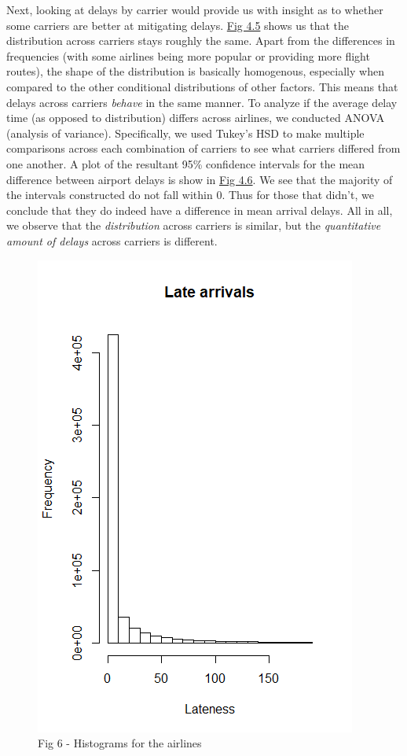 \documentclass[12pt, a4paper, openany]{book}
\newcommand\tab[1][1cm]{\hspace*{#1}}
\begin{document}
			\tab Next, looking at delays by carrier would provide us with insight as to whether some carriers are better at mitigating delays. \underline{Fig 4.5} shows us that the distribution across carriers stays roughly the same. Apart from the differences in frequencies (with some airlines being more popular or providing more flight routes), the shape of the distribution is basically homogenous, especially when compared to the other conditional distributions of other factors. This means that delays across carriers \textit{behave} in the same manner. To analyze if the average delay time (as opposed to distribution) differs across airlines, we conducted ANOVA (analysis of variance). Specifically, we used Tukey’s HSD to make multiple comparisons across each combination of carriers to see what carriers differed from one another. A plot of the resultant 95\% confidence intervals for the mean difference between airport delays is show in \underline{Fig 4.6}. We see that the majority of the intervals constructed do not fall within 0. Thus for those that didn’t, we conclude that they do indeed have a difference in mean arrival delays. All in all, we observe that the \textit{distribution} across carriers is similar, but the \textit{quantitative amount of delays} across carriers is different. \\
			\begin{figure}[h]
	 		\includegraphics[width = 1 \textwidth]{../figures/LateArrivalsHistogram}
	 		\caption{Fig 6 - Histograms for the airlines}
	 		\end{figure}
\end{document}
